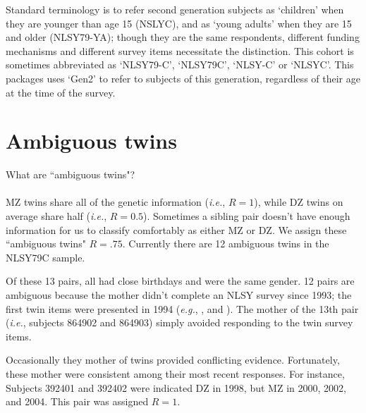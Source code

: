 \documentclass{article}\usepackage[]{graphicx}\usepackage[]{color}
\begin{document}
Standard terminology is to refer second generation subjects as `children' when they are younger than age 15 (NSLYC), and as `young adults' when they are 15 and older (NLSY79-YA); though they are the same respondents, different funding mechanisms and different survey items necessitate the distinction.  This cohort is sometimes abbreviated as `NLSY79-C', `NLSY79C', `NLSY-C' or `NLSYC'. This packages uses `Gen2' to refer to subjects of this generation, regardless of their age at the time of the survey.

\section{Ambiguous twins}
\textsf{What are ``ambiguous twins"?}\\ \\
MZ twins share all of the genetic information (\emph{i.e.}, $R=1$), while DZ twins on average share half (\emph{i.e.}, $R=0.5$).  Sometimes a sibling pair doesn't have enough information for us to classify comfortably as either MZ or DZ.  We assign these ``ambiguous twins" $R=.75$.  Currently there are 12 ambiguous twins in the NLSY79C sample.  

Of these 13 pairs, all had close birthdays and were the same gender.  12 pairs are ambiguous because the mother didn't complete an NLSY survey since 1993; the first twin items were presented in 1994 (\emph{e.g.}, , and ).  The mother of the 13th pair (\emph{i.e.}, subjects 864902 and 864903) simply avoided responding to the twin survey items.

Occasionally they mother of twins provided conflicting evidence. Fortunately, these mother were consistent among their most recent responses.  For instance, Subjects 392401 and 392402 were indicated DZ in 1998, but MZ in 2000, 2002, and 2004.  This pair was assigned $R=1$.
\end{document}
